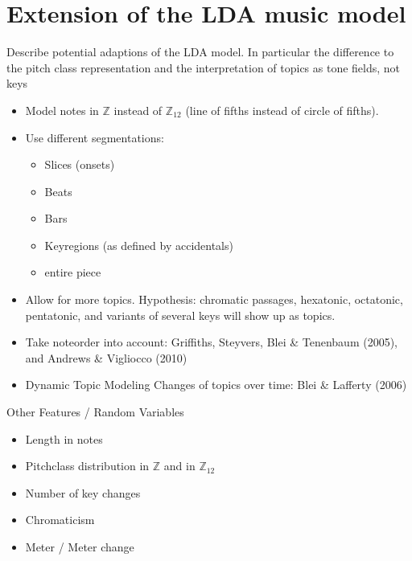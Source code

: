 \documentclass[letterpaper,10pt,english]{sphinxmanual}
\begin{document}
\section{Extension of the LDA music model}
\label{\detokenize{5_notes:extension-of-the-lda-music-model}}
\sphinxAtStartPar
Describe potential adaptions of the LDA model. In particular the
difference to the pitch class representation and the interpretation of
topics as tone fields, not keys
\begin{itemize}
\item {} 
\sphinxAtStartPar
Model notes in \(\mathbb Z\) instead of \(\mathbb Z_{12}\)
(line of fifths instead of circle of fifths).

\item {} 
\sphinxAtStartPar
Use different segmentations:
\begin{itemize}
\item {} 
\sphinxAtStartPar
Slices (onsets)

\item {} 
\sphinxAtStartPar
Beats

\item {} 
\sphinxAtStartPar
Bars

\item {} 
\sphinxAtStartPar
Key\sphinxhyphen{}regions (as defined by accidentals)

\item {} 
\sphinxAtStartPar
entire piece

\end{itemize}

\item {} 
\sphinxAtStartPar
Allow for more topics. Hypothesis: chromatic passages, hexatonic,
octatonic, pentatonic, and variants of several keys will show up as
topics.

\item {} 
\sphinxAtStartPar
Take note\sphinxhyphen{}order into account: Griffiths, Steyvers, Blei \& Tenenbaum
(2005), and Andrews \& Vigliocco (2010)

\item {} 
\sphinxAtStartPar
Dynamic Topic Modeling \sphinxhyphen{} Changes of topics over time: Blei \& Lafferty
(2006)

\end{itemize}

\sphinxAtStartPar
Other Features / Random Variables
\begin{itemize}
\item {} 
\sphinxAtStartPar
Length in notes

\item {} 
\sphinxAtStartPar
Pitch\sphinxhyphen{}class distribution in \(\mathbb Z\) and in
\(\mathbb Z_{12}\)

\item {} 
\sphinxAtStartPar
Number of key changes

\item {} 
\sphinxAtStartPar
Chromaticism

\item {} 
\sphinxAtStartPar
Meter / Meter change

\end{itemize}
\end{document}
